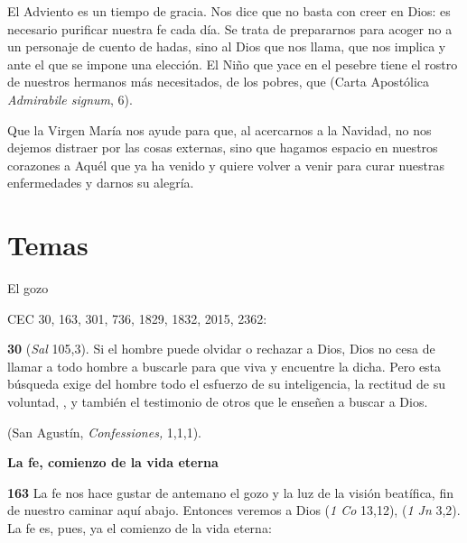 El Adviento es un tiempo de gracia. Nos dice que no basta con creer en Dios: es necesario purificar nuestra fe cada día. Se trata de prepararnos para acoger no a un personaje de cuento de hadas, sino al Dios que nos llama, que nos implica y ante el que se impone una elección. El Niño que yace en el pesebre tiene el rostro de nuestros hermanos más necesitados, de los pobres, que  (Carta Apostólica \emph{Admirabile signum}, 6).

Que la Virgen María nos ayude para que, al acercarnos a la Navidad, no nos dejemos distraer por las cosas externas, sino que hagamos espacio en nuestros corazones a Aquél que ya ha venido y quiere volver a venir para curar nuestras enfermedades y darnos su alegría.



\section{Temas}

El gozo

CEC 30, 163, 301, 736, 1829, 1832, 2015, 2362:

\textbf{30}  (\emph{Sal} 105,3). Si el hombre puede olvidar o rechazar a Dios, Dios no cesa de llamar a todo hombre a buscarle para que viva y encuentre la dicha. Pero esta búsqueda exige del hombre todo el esfuerzo de su inteligencia, la rectitud de su voluntad, , y también el testimonio de otros que le enseñen a buscar a Dios.

 (San Agustín, \emph{Confessiones,} 1,1,1).

\textbf{La fe, comienzo de la vida eterna}

\textbf{163} La fe nos hace gustar de antemano el gozo y la luz de la visión beatífica, fin de nuestro caminar aquí abajo. Entonces veremos a Dios  (\emph{1 Co} 13,12),  (\emph{1 Jn} 3,2). La fe es, pues, ya el comienzo de la vida eterna:

